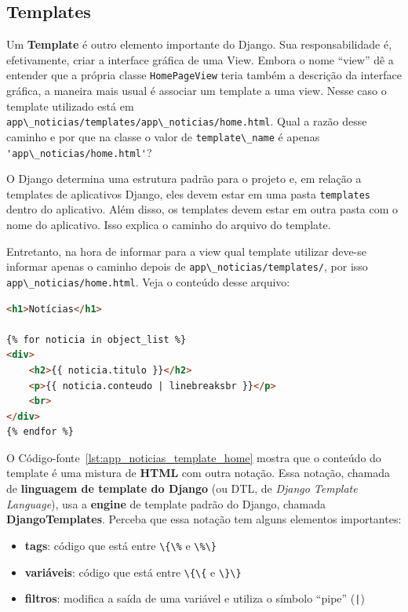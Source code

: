 \documentclass[brazil,a4paper,oneside,openright,parskip=full]{book}
\newcommand{\passthrough}[1]{#1}
\providecommand{\tightlist}{%
  \setlength{\itemsep}{0pt}\setlength{\parskip}{0pt}}
\begin{document}
\hypertarget{templates}{%
\subsection{Templates}\label{templates}}

Um \textbf{Template} é outro elemento importante do Django. Sua
responsabilidade é, efetivamente, criar a interface gráfica de uma View.
Embora o nome ``view'' dê a entender que a própria classe
\passthrough{\lstinline!HomePageView!} teria também a descrição da
interface gráfica, a maneira mais usual é associar um template a uma
view. Nesse caso o template utilizado está em
\passthrough{\lstinline!app\_noticias/templates/app\_noticias/home.html!}.
Qual a razão desse caminho e por que na classe o valor de
\passthrough{\lstinline!template\_name!} é apenas
\passthrough{\lstinline!'app\_noticias/home.html'!}?

O Django determina uma estrutura padrão para o projeto e, em relação a
templates de aplicativos Django, eles devem estar em uma pasta
\passthrough{\lstinline!templates!} dentro do aplicativo. Além disso, os
templates devem estar em outra pasta com o nome do aplicativo. Isso
explica o caminho do arquivo do template.

Entretanto, na hora de informar para a view qual template utilizar
deve-se informar apenas o caminho depois de
\passthrough{\lstinline!app\_noticias/templates/!}, por isso
\passthrough{\lstinline!app\_noticias/home.html!}. Veja o conteúdo desse
arquivo:

\begin{lstlisting}[language=HTML, caption={Código inicial para o template "home" do software Notícias}, label=lst:app_noticias_template_home]
<h1>Notícias</h1>

{% for noticia in object_list %}
<div>
    <h2>{{ noticia.titulo }}</h2>
    <p>{{ noticia.conteudo | linebreaksbr }}</p>
    <br>
</div>
{% endfor %}
\end{lstlisting}

O Código-fonte~\ref{lst:app_noticias_template_home} mostra que o
conteúdo do template é uma mistura de \textbf{HTML} com outra notação.
Essa notação, chamada de \textbf{linguagem de template do Django} (ou
DTL, de \emph{Django Template Language}), usa a \textbf{engine} de
template padrão do Django, chamada \textbf{DjangoTemplates}. Perceba que
essa notação tem alguns elementos importantes:

\begin{itemize}
\tightlist
\item
  \textbf{tags}: código que está entre \passthrough{\lstinline!\{\%!} e
  \passthrough{\lstinline!\%\}!}
\item
  \textbf{variáveis}: código que está entre
  \passthrough{\lstinline!\{\{!} e \passthrough{\lstinline!\}\}!}
\item
  \textbf{filtros}: modifica a saída de uma variável e utiliza o símbolo
  ``pipe'' (\passthrough{\lstinline!|!})
\end{itemize}
\end{document}

